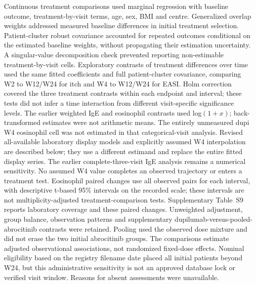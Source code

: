 Continuous treatment comparisons used marginal regression with baseline outcome, treatment-by-visit terms, age, sex, BMI and centre. Generalized overlap weights addressed measured baseline differences in initial treatment selection. Patient-cluster robust covariance accounted for repeated outcomes conditional on the estimated baseline weights, without propagating their estimation uncertainty. A singular-value decomposition check prevented reporting non-estimable treatment-by-visit cells. Exploratory contrasts of treatment differences over time used the same fitted coefficients and full patient-cluster covariance, comparing W2 to W12/W24 for itch and W4 to W12/W24 for EASI. Holm correction covered the three treatment contrasts within each endpoint and interval; these tests did not infer a time interaction from different visit-specific significance levels. The earlier weighted IgE and eosinophil contrasts used log$(1+x)$; back-transformed estimates were not arithmetic means. The entirely unmeasured dupi W4 eosinophil cell was not estimated in that categorical-visit analysis. Revised all-available laboratory display models and explicitly assumed W4 interpolation are described below; they use a different estimand and replace the entire fitted display series. The earlier complete-three-visit IgE analysis remains a numerical sensitivity. No assumed W4 value completes an observed trajectory or enters a treatment test. Eosinophil paired changes use all observed pairs for each interval, with descriptive t-based 95\% intervals on the recorded scale; these intervals are not multiplicity-adjusted treatment-comparison tests. Supplementary Table~S9 reports laboratory coverage and these paired changes. Unweighted adjustment, group balance, observation patterns and supplementary dupilumab-versus-pooled-abrocitinib contrasts were retained. Pooling used the observed dose mixture and did not erase the two initial abrocitinib groups. The comparisons estimate adjusted observational associations, not randomized fixed-dose effects. Nominal eligibility based on the registry filename date placed all initial patients beyond W24, but this administrative sensitivity is not an approved database lock or verified visit window. Reasons for absent assessments were unavailable.

